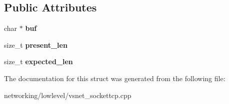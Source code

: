 \subsection*{Public Attributes}
\begin{DoxyCompactItemize}
\item 
char $\ast$ {\bfseries buf}\hypertarget{structVsnetTCPSocket_1_1Blob_af24027a78fb4cd5dc78c12e8c7b2b4c0}{}\label{structVsnetTCPSocket_1_1Blob_af24027a78fb4cd5dc78c12e8c7b2b4c0}

\item 
size\+\_\+t {\bfseries present\+\_\+len}\hypertarget{structVsnetTCPSocket_1_1Blob_a36ec1b32a2945ebf56e8622aeeababc4}{}\label{structVsnetTCPSocket_1_1Blob_a36ec1b32a2945ebf56e8622aeeababc4}

\item 
size\+\_\+t {\bfseries expected\+\_\+len}\hypertarget{structVsnetTCPSocket_1_1Blob_aa78a2fd226c70b5932b2073c23dfc2d3}{}\label{structVsnetTCPSocket_1_1Blob_aa78a2fd226c70b5932b2073c23dfc2d3}

\end{DoxyCompactItemize}


The documentation for this struct was generated from the following file\+:\begin{DoxyCompactItemize}
\item 
networking/lowlevel/vsnet\+\_\+sockettcp.\+cpp\end{DoxyCompactItemize}
